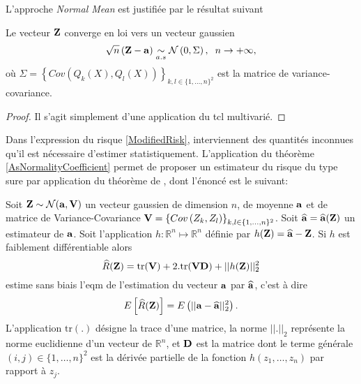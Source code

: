 L\rq{}approche \textit{Normal Mean} est justifiée par le résultat suivant 
\begin{Theo}\label{AsNormalityCoefficient}
Le vecteur $\bold{Z}$ converge en loi vers un vecteur gaussien
\begin{equation}
\sqrt{n}\left(\bold{Z}-\bold{a}\right)\underset{a.s}{\sim}\mathcal{N}\left(0,\Sigma\right),\hspace{0.2cm} n\rightarrow+\infty,
\end{equation}
où $\Sigma=\left\{Cov\left(Q_{k}(X),Q_{l}(X)\right)\right\}_{k,l\in\{1,\ldots,n\}^{2}}$ est la matrice de variance-covariance. 
\end{Theo}
\begin{proof}
Il s\rq{}agit simplement d\rq{}une application du \gls{tcl} multivarié.
\end{proof}
Dans l\rq{}expression du risque \eqref{ModifiedRisk}, interviennent des quantités inconnues qu'il est nécessaire d'estimer statistiquement. L\rq{}application du théorème \ref{AsNormalityCoefficient} permet de proposer un estimateur du risque du type \gls{sure} par application du théorème de \citet{St81}, dont l\rq{}énoncé est le suivant:
\begin{Theo}[Stein 1981]\label{TheoSURE}
Soit $\bold{Z}\sim\mathcal{N}(\bold{a},\bold{V})$ un vecteur gaussien de dimension $n$, de moyenne $\bold{a}$ et de matrice de Variance-Covariance $\bold{V}=\left\{Cov\left(Z_{k},Z_{l}\right)\right\}_{k,l\in\{1,\ldots,n\}^{2}}$. Soit $\widehat{\bold{a}}=\widehat{\bold{a}}(\bold{Z})$ un estimateur de $\bold{a}$. Soit l\rq{}application $h:\mathbb{R}^{n}\mapsto\mathbb{R}^{n}$ définie par $h(\bold{Z})=\widehat{\bold{a}}-\bold{Z}$. Si $h$ est faiblement différentiable alors
\begin{equation}\label{SUREFormula}
\widehat{R}(\bold{Z})=\text{tr}(\bold{V})+2. \text{tr}(\bold{VD})+||h(\bold{Z})||_{2}^{2}
\end{equation} 
estime sans biais l\rq{}\gls{eqm} de l'estimation du vecteur $\bold{a}$ par $\widehat{\bold{a}}$, c\rq{}est à dire 
\begin{equation*}
E\left[\widehat{R}(\bold{Z})\right]=E\left(||\bold{a}-\bold{\widehat{a}}||_{2}^{2}\right).
\end{equation*}
L\rq{}application $\text{tr}(.)$ désigne la trace d\rq{}une matrice, la norme $||.||_{2}$ représente la norme euclidienne d\rq{}un vecteur de $\mathbb{R}^{n}$, et $\bold{D}$ est la matrice dont le terme générale $(i,j)\in\{1,\ldots,n\}^{2}$ est la dérivée partielle de la fonction $h(z_{1},\ldots,z_{n})$ par rapport à $z_{j}$.   
\end{Theo}
